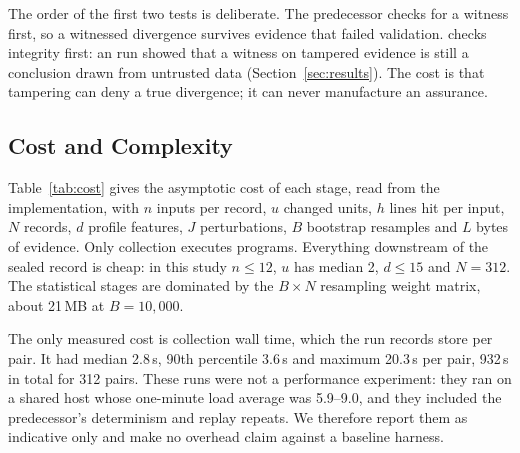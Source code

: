 The order of the first two tests is deliberate. The predecessor checks for a witness first, so a witnessed divergence survives evidence that failed validation. \sbg{} checks integrity first: an \ers{} run showed that a witness on tampered evidence is still a conclusion drawn from untrusted data (Section~\ref{sec:results}). The cost is that tampering can deny a true divergence; it can never manufacture an assurance.

\subsection{Cost and Complexity}\label{sec:cost}
Table~\ref{tab:cost} gives the asymptotic cost of each stage, read from the implementation, with $n$ inputs per record, $u$ changed units, $h$ lines hit per input, $N$ records, $d$ profile features, $J$ perturbations, $B$ bootstrap resamples and $L$ bytes of evidence. Only collection executes programs. Everything downstream of the sealed record is cheap: in this study $n\le12$, $u$ has median 2, $d\le15$ and $N=312$. The statistical stages are dominated by the $B\times N$ resampling weight matrix, about 21\,MB at $B=10{,}000$.

The only measured cost is collection wall time, which the run records store per pair. It had median 2.8\,s, 90th percentile 3.6\,s and maximum 20.3\,s per pair, 932\,s in total for 312 pairs. These runs were not a performance experiment: they ran on a shared host whose one-minute load average was 5.9--9.0, and they included the predecessor's determinism and replay repeats. We therefore report them as indicative only and make no overhead claim against a baseline harness.

